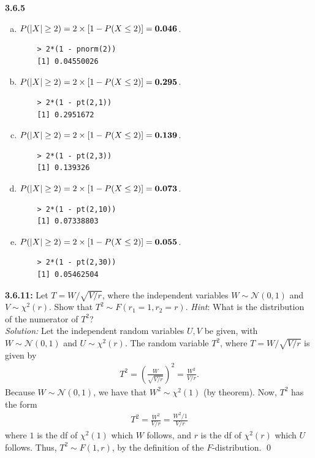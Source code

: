 \documentclass{book}
\theoremstyle{definition}
\newcommand{\N}{\mathcal{N}}
\newcommand{\f}[2]{\frac{#1}{#2}}
\newcommand{\lp}{\left(}
\newcommand{\rp}{\right)}
\begin{document}
\newpage
\noindent\textbf{3.6.5}
\begin{enumerate}[(a)] 
	\item $P(\abs{X} \geq 2) = 2\times[1 - P(X \leq 2)] = \textbf{0.046}$.
	\begin{lstlisting}
	> 2*(1 - pnorm(2))
	[1] 0.04550026
	\end{lstlisting}
	
	\item $P(\abs{X} \geq 2) = 2\times[1 - P(X \leq 2)] = \textbf{0.295}$.
	\begin{lstlisting}
	> 2*(1 - pt(2,1))
	[1] 0.2951672
	\end{lstlisting}
	
	\item $P(\abs{X} \geq 2) = 2\times[1 - P(X \leq 2)] = \textbf{0.139}$.
	\begin{lstlisting}
	> 2*(1 - pt(2,3))
	[1] 0.139326
	\end{lstlisting}
	
	\item $P(\abs{X} \geq 2) = 2\times[1 - P(X \leq 2)] = \textbf{0.073}$.
	\begin{lstlisting}
	> 2*(1 - pt(2,10))
	[1] 0.07338803
	\end{lstlisting}
	
	\item $P(\abs{X} \geq 2) = 2\times[1 - P(X \leq 2)] = \textbf{0.055}$.
	\begin{lstlisting}
	> 2*(1 - pt(2,30))
	[1] 0.05462504
	\end{lstlisting}
\end{enumerate}






\newpage
\noindent\textbf{3.6.11:} Let $T = W/\sqrt{V/r}$, where the independent variables $W \sim \mathcal{N}(0,1)$ and $V \sim \chi^2(r)$. Show that $T^2\sim F(r_1 = 1, r_2 = r)$. \textit{Hint}: What is the distribution of the numerator of $T^2$?\\

\noindent \textit{Solution:} Let the independent random variables $U,V$ be given, with $W\sim \N(0,1)$ and $U\sim \chi^2(r)$. The random variable $T^2$, where $T = W / \sqrt{V/r}$ is given by
\begin{align}
T^2 = \lp \f{W}{\sqrt{V/r}} \rp^2 = \f{W^2}{V/r}.
\end{align}
Because $W \sim \N(0,1)$, we have that $W^2 \sim \chi^2(1)$ (by theorem). Now, $T^2$ has the form 
\begin{align}
T^2 = \f{W^2}{V/r} = \f{W^2/1}{V/r}
\end{align}
where $1$ is the df of $\chi^2(1)$ which $W$ follows, and $r$ is the df of $\chi^2(r)$ which $U$ follows. Thus, $T^2 \sim F(1,r)$, by the definition of the $F$-distribution. \qed
\end{document}
